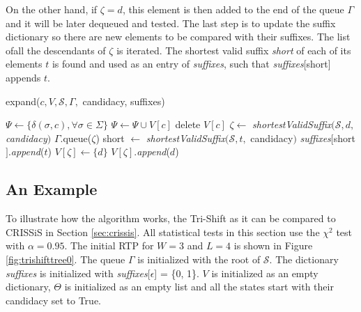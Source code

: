 {On the other hand, if $\zeta = d$, this element is then added to the end of the queue $\Gamma$ and it will be later dequeued and tested.  The last step is to update the suffix dictionary so there are new elements to be compared with their suffixes. The list ofall the descendants of $\zeta$ is iterated. The shortest valid suffix \textit{short} of each of its elements $t$ is found and used as an entry of \textit{suffixes}, such that \textit{suffixes}[short] appends $t$.
  
  \begin{algorithm}[t]
  \caption{expand($c, V, \mathcal{S},\Gamma,$ candidacy, suffixes)\label{alg:expand}}
    \begin{algorithmic}[1]
      	\State $\Psi \gets \{\delta(\sigma,c),\forall \sigma \in \Sigma\}$
      		\State $\Psi \gets \Psi \cup V[c]$
      		\State delete $V[c]$
      	\EndIf
      		\State $\zeta \gets $ \textit{shortestValidSuffix}$(\mathcal{S}, d,$ \textit{candidacy}$)$
      			\State $\Gamma$.queue($\zeta$)
      				\State short $\gets $ \textit{shortestValidSuffix}$(\mathcal{S}, t,$ candidacy$)$
      				\State \textit{suffixes}$[$short$]$.\textit{append}($t$)
      			\EndFor
      		\Else
      				\State $V[\zeta] \gets \{d\}$
      			\Else
      				\State $V[\zeta]$.\textit{append}($d$)
      			\EndIf
      		\EndIf
      	\EndFor
      \EndProcedure
    \end{algorithmic}
  \end{algorithm}

\subsection{An Example}

To illustrate how the algorithm works, the Tri-Shift as it can be compared to CRISSiS in Section \ref{sec:crissis}. All statistical tests in this section use the $\chi^2$ test with $\alpha = 0.95$. The initial RTP for $W = 3$ and $L = 4$ is shown in Figure \ref{fig:trishifttree0}. The queue $\Gamma$ is initialized with the root of $\mathcal{S}$. The dictionary \textit{suffixes} is initialized with  \textit{suffixes}[$\epsilon$] = \{0, 1\}. $V$ is initialized as an empty dictionary, $\Theta$ is initialized as an empty list and all the states start with their candidacy set to True.

}
